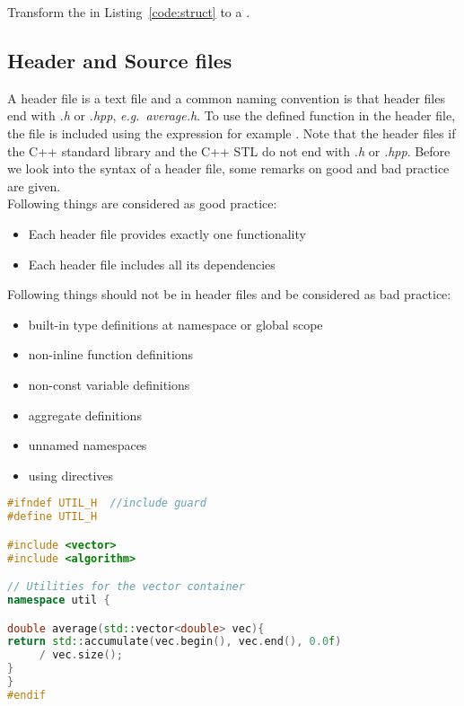 \begin{exercise}
Transform the  in Listing~\ref{code:struct} to a .
\end{exercise}

\subsection{Header and Source files}
A header file is a text file and a common naming convention is that header files end with \textit{.h} or \textit{.hpp}, \emph{e.g.}\ \textit{average.h}. To use the defined function in the header file, the file is included using the  expression for example . Note that the header files if the C++ standard library and the C++ STL do not end with  \textit{.h} or \textit{.hpp}. Before we look into the syntax of a header file, some remarks on good and bad practice are given.\\ 

\noindent Following things are considered as good practice:
\begin{itemize}
\item Each header file provides exactly one functionality 
\item Each header file includes all its dependencies
\end{itemize}
Following things should not be in header files and be considered as bad practice:\\
\begin{itemize}
\item built-in type definitions at namespace or global scope
\item non-inline function definitions
\item non-const variable definitions
\item aggregate definitions
\item unnamed namespaces
\item using directives
\end{itemize}

\begin{lstlisting}[language=c++,caption={Example for header file.\label{code:header}},float,floatplacement=tb]
#ifndef UTIL_H  //include guard
#define UTIL_H

#include <vector>
#include <algorithm>

// Utilities for the vector container
namespace util {

double average(std::vector<double> vec){
return std::accumulate(vec.begin(), vec.end(), 0.0f) 
     / vec.size();
}
}
#endif
\end{lstlisting}
\vspace{0.25cm}

